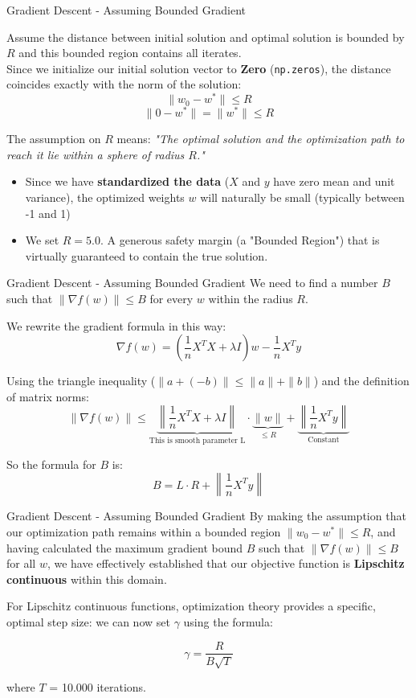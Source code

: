\documentclass[10pt]{beamer}
\begin{document}
\begin{frame}{Gradient Descent - Assuming Bounded Gradient}
    
    Assume the distance between initial solution and optimal solution is bounded by $R$ and this bounded region contains all iterates. \\[0.1cm]
    Since we initialize our initial solution vector to \textbf{Zero} (\texttt{np.zeros}), the distance coincides exactly with the norm of the solution:
    $$\|w_0 - w^*\| \le R$$
    $$\|0 - w^*\| = \|w^*\| \le R$$

    The assumption on $R$ means: \textit{"The optimal solution and the optimization path to reach it lie within a sphere of radius $R$."}

    \begin{itemize}
        \item Since we have \textbf{standardized the data} ($X$ and $y$ have zero mean and unit variance), the optimized weights $w$ will naturally be small (typically between -1 and 1)
        \item We set \textbf{$R = 5.0$}. A generous safety margin (a "Bounded Region") that is virtually guaranteed to contain the true solution.
    \end{itemize}
\end{frame}

\begin{frame}{Gradient Descent - Assuming Bounded Gradient}
    \small
    We need to find a number $B$ such that $\|\nabla f(w)\| \le B$ for every $w$ within the radius $R$.

    We rewrite the gradient formula in this way:
    $$\nabla f(w) = \left(\frac{1}{n}X^T X + \lambda I\right)w - \frac{1}{n}X^T y$$

    Using the triangle inequality ($\|a + (-b)\| \le \|a\| + \|b\|$) and the definition of matrix norms:
    $$\|\nabla f(w)\| \le \underbrace{\left\| \frac{1}{n}X^T X + \lambda I \right\|}_{\text{This is smooth parameter L}} \cdot \underbrace{\|w\|}_{\le R} + \underbrace{\left\| \frac{1}{n}X^T y \right\|}_{\text{Constant}}$$

    \vspace{0.3cm}
    So the formula for $B$ is:
    $$B = L \cdot R + \left\| \frac{1}{n}X^T y \right\|$$
\end{frame}

\begin{frame}{Gradient Descent - Assuming Bounded Gradient}
    By making the assumption that our optimization path remains within a bounded region $\|w_0 - w^*\| \le R$, and having calculated the maximum gradient bound $B$ such that $\|\nabla f(w)\| \le B$ for all $w$, we have effectively established that our objective function is \textbf{Lipschitz continuous} within this domain. 

    \vspace{0.4cm}
    For Lipschitz continuous functions, optimization theory provides a specific, optimal step size: we can now set $\gamma$ using the formula:
    
    $$\gamma = \frac{R}{B \sqrt{T}}$$

    where $T$ = 10.000 iterations.
\end{frame}
\end{document}
